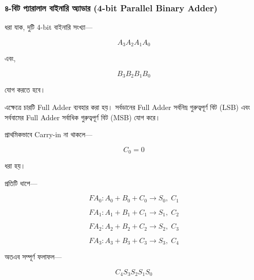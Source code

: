 
\subsubsection*{৪-বিট প্যারালাল বাইনারি অ্যাডার
(\textenglish{4-bit Parallel Binary Adder})}

ধরা যাক, দুটি \(4\)-\textenglish{bit} বাইনারি সংখ্যা—

\[
A_3A_2A_1A_0
\]

এবং,

\[
B_3B_2B_1B_0
\]

যোগ করতে হবে।

এক্ষেত্রে চারটি \textenglish{Full Adder} ব্যবহার করা হয়।
সর্বডানের \textenglish{Full Adder} সর্বনিম্ন গুরুত্বপূর্ণ বিট
(\textenglish{LSB}) এবং সর্ববামের \textenglish{Full Adder}
সর্বাধিক গুরুত্বপূর্ণ বিট (\textenglish{MSB}) যোগ করে।

প্রাথমিকভাবে \textenglish{Carry-in} না থাকলে—

\[
C_0=0
\]

ধরা হয়।

প্রতিটি ধাপে—

\[
FA_0:
A_0+B_0+C_0
\longrightarrow
S_0,\;C_1
\]

\[
FA_1:
A_1+B_1+C_1
\longrightarrow
S_1,\;C_2
\]

\[
FA_2:
A_2+B_2+C_2
\longrightarrow
S_2,\;C_3
\]

\[
FA_3:
A_3+B_3+C_3
\longrightarrow
S_3,\;C_4
\]

অতএব সম্পূর্ণ ফলাফল—

\[
\boxed{C_4S_3S_2S_1S_0}
\]



